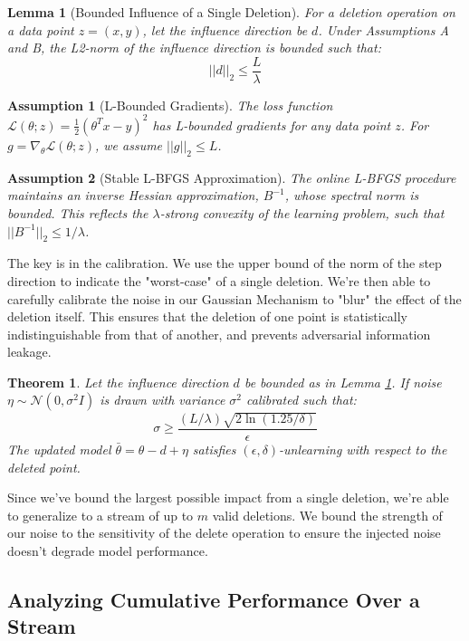 \documentclass[a4paper,12pt]{article}
\newtheorem{theorem}{Theorem}
\newtheorem{lemma}{Lemma}
\newtheorem{assumption}{Assumption}
\begin{document}
\begin{lemma}[Bounded Influence of a Single Deletion]
\label{lem:bounded-influence}
For a deletion operation on a data point $z=(x, y)$, let the influence direction be $d$. Under Assumptions A and B, the L2-norm of the influence direction is bounded such that:
$$
||d||_2 \leq \frac{L}{\lambda}
$$
\end{lemma}

\begin{assumption}[L-Bounded Gradients]
\label{assum:lipschitz}
The loss function $\mathcal{L}(\theta; z) = \frac{1}{2}(\theta^T x - y)^2$ has L-bounded gradients for any data point $z$. For $g = \nabla_\theta \mathcal{L}(\theta; z)$, we assume $||g||_2 \leq L$.
\end{assumption}

\begin{assumption}[Stable L-BFGS Approximation]
\label{assum:stable-lbfgs}
The online L-BFGS procedure maintains an inverse Hessian approximation, $B^{-1}$, whose spectral norm is bounded. This reflects the $\lambda$-strong convexity of the learning problem, such that $||B^{-1}||_2 \leq 1/\lambda$.
\end{assumption}

The key is in the calibration. We use the upper bound of the norm of the step direction to indicate the "worst-case" of a single deletion. We're then able to carefully calibrate the noise in our Gaussian Mechanism to "blur" the effect of the deletion itself. This ensures that the deletion of one point is statistically indistinguishable from that of another, and prevents adversarial information leakage.


\begin{theorem}
\label{thm:single-step-unlearning}
Let the influence direction $d$ be bounded as in Lemma \ref{lem:bounded-influence}. If noise $\eta \sim \mathcal{N}(0, \sigma^2 I)$ is drawn with variance $\sigma^2$ calibrated such that:
$$
\sigma \ge \frac{(L/\lambda) \sqrt{2 \ln(1.25/\delta)}}{\epsilon}
$$
The updated model $\bar{\theta} = \theta - d + \eta$ satisfies $(\epsilon, \delta)$-unlearning with respect to the deleted point.
\end{theorem}

Since we've bound the largest possible impact from a single deletion, we're able to generalize to a stream of up to $m$ valid deletions. We bound the strength of our noise to the sensitivity of the delete operation to ensure the injected noise doesn't degrade model performance.
\subsection{Analyzing Cumulative Performance Over a Stream}
\end{document}
